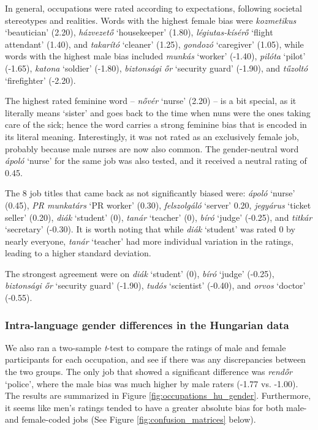 \documentclass[11pt]{article}
\begin{document}
In general, occupations were rated according to expectations, following societal stereotypes and realities. Words with the highest female bias were \textit{kozmetikus} `beautician' (2.20), \textit{házvezető} `housekeeper' (1.80), \textit{légiutas-kísérő} `flight attendant' (1.40), and \textit{takarító} `cleaner' (1.25), \textit{gondozó} `caregiver' (1.05), while words with the highest male bias included \textit{munkás} `worker' (-1.40), \textit{pilóta} `pilot' (-1.65), \textit{katona} `soldier' (-1.80), \textit{biztonsági őr} `security guard' (-1.90), and \textit{tűzoltó} `firefighter' (-2.20).

The highest rated feminine word -- \textit{nővér} `nurse' (2.20) -- is a bit special, as it literally means `sister' and goes back to the time when nuns were the ones taking care of the sick; hence the word carries a strong feminine bias that is encoded in its literal meaning. Interestingly, it was not rated as an exclusively female job, probably because male nurses are now also common. The gender-neutral word \textit{ápoló} `nurse' for the same job was also tested, and it received a neutral rating of 0.45.

The 8 job titles that came back as not significantly biased were: \textit{ápoló} `nurse' (0.45), \textit{PR munkatárs} `PR worker' (0.30), \textit{felszolgáló} `server' 0.20, \textit{jegyárus} `ticket seller' (0.20), \textit{diák} `student' (0), \textit{tanár} `teacher' (0), \textit{bíró} `judge' (-0.25), and \textit{titkár} `secretary' (-0.30). It is worth noting that while \textit{diák} `student' was rated 0 by nearly everyone, \textit{tanár} `teacher' had more individual variation in the ratings, leading to a higher standard deviation.

The strongest agreement were on \textit{diák} `student' (0), \textit{bíró} `judge' (-0.25), \textit{biztonsági őr} `security guard' (-1.90), \textit{tudós} `scientist' (-0.40), and \textit{orvos} `doctor' (-0.55).







\subsubsection{Intra-language gender differences in the Hungarian data}

We also ran a two-sample \textit{t}-test to compare the ratings of male and female participants for each occupation, and see if there was any discrepancies between the two groups. The only job that showed a significant difference was \textit{rendőr} `police', where the male bias was much higher by male raters (-1.77 vs. -1.00). The results are summarized in Figure \ref{fig:occupations_hu_gender}. Furthermore, it seems like men's ratings tended to have a greater absolute bias for both male- and female-coded jobs (See Figure \ref{fig:confusion_matrices} below).
\end{document}
